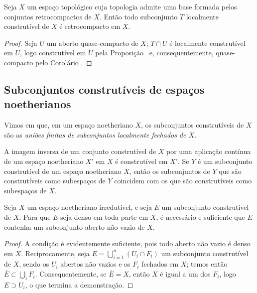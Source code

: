 \begin{corollary}[9.1.13]
\label{0.9.1.13}
Seja $X$ um espaço topológico cuja topologia admite uma base formada pelos conjuntos retrocompactos de $X$.
Então todo subconjunto $T$ localmente construtível de $X$ é retrocompacto em $X$.
\end{corollary}

\begin{proof}
Seja $U$ um aberto quase-compacto de $X$; $T\cap U$ é localmente construtível em $U$, logo construtível em $U$ pela Proposição~ e, consequentemente, quase-compacto pelo Corolário .
\end{proof}

\subsection{Subconjuntos construtíveis de espaços noetherianos}
\label{subsection:0.9.2}

\begin{env}[9.2.1]
\label{0.9.2.1}
Vimos em  que, em um espaço noetheriano $X$, os subconjuntos construtíveis de $X$ são as \emph{uniões finitas de subconjuntos localmente fechados de $X$}.

A imagem inversa de um conjunto construtível de $X$ por uma aplicação contínua de um espaço noetheriano $X'$ em $X$ é construtível em $X'$.
Se $Y$ é um subconjunto construtível de um espaço noetheriano $X$, então os subconjuntos de $Y$ que são construtíveis como subespaços de $Y$ coincidem com os que são construtíveis como subespaços de $X$.
\end{env}

\begin{proposition}[9.2.2]
\label{0.9.2.2}
Seja $X$ um espaço noetheriano irredutível, e seja $E$ um subconjunto construtível de $X$.
Para que $E$ seja denso em toda parte em $X$, é necessário e suficiente que $E$ contenha um subconjunto aberto não vazio de $X$.
\end{proposition}

\begin{proof}
A condição é evidentemente suficiente, pois todo aberto não vazio é denso em $X$.
Reciprocamente, seja $E=\bigcup_{i=1}^n(U_i\cap F_i)$ um subconjunto construtível de $X$, sendo os $U_i$ abertos não vazios e os $F_i$ fechados em $X$; temos então $\overline{E}\subset\bigcup_i F_i$.
Consequentemente, se $\overline{E}=X$, então $X$ é igual a um dos $F_i$, logo $E\supset U_i$, o que termina a demonstração.
\end{proof}

